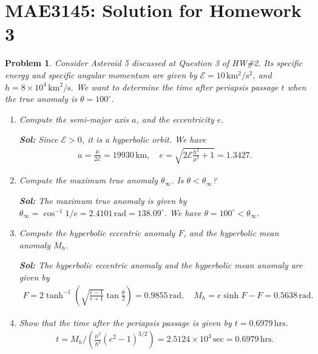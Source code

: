 \documentclass[10pt]{article}
\date{}
\newcommand{\parenth}[1]{\ensuremath{\left( #1 \right)}}
\theoremstyle{plain}\theorembodyfont{\normalfont}
\newtheorem{prob}{Problem}[section]
\newenvironment{subprob}%
{\renewcommand{\theenumi}{\alph{enumi}}\renewcommand{\labelenumi}{(\theenumi)}\begin{enumerate}}%
{\end{enumerate}}%
\begin{document}
\pagestyle{empty}
\section*{MAE3145: Solution for Homework 3}


\begin{prob}
Consider Asteroid 5 discussed at Question 3 of HW\#2. Its specific energy and specific angular momentum are given by $\mathcal{E}=10\,\mathrm{km^2/s^2}$, and $h=8\times 10^4\,\mathrm{km^2/s}$. We want to determine the time after periapsis passage $t$ when the true anomaly is $\theta=100^\circ$.
\begin{subprob}
\item Compute the semi-major axis $a$, and the eccentricity $e$.

\textbf{Sol:} Since $\mathcal{E}>0$, it is a hyperbolic orbit. We have
\begin{align*}
a = \frac{\mu}{2\mathcal{E}} = 19930\,\mathrm{km},\quad 
e = \sqrt{2\mathcal{E} \frac{h^2}{\mu^2} +1} = 1.3427.
\end{align*}

\item Compute the maximum true anomaly $\theta_\infty$. Is $\theta < \theta_\infty$?

\textbf{Sol:} The maximum true anomaly is given by $\theta_\infty=\cos^{-1}{1/e} = 2.4101\,\mathrm{rad} = 138.09^\circ$. We have $\theta = 100^\circ < \theta_\infty$.

\item Compute the hyperbolic eccentric anomaly $F$, and the hyperbolic mean anomaly $M_h$.

\textbf{Sol:} The hyperbolic eccentric anomaly and the hyperbolic mean anomaly are given by
\begin{align*}
F = 2\tanh^{-1}\parenth{\sqrt{\frac{e-1}{e+1}} \tan\frac{\theta}{2}}=0.9855\,\mathrm{rad},\quad M_h = e\sinh F-F= 0.5638\,\mathrm{rad}.
\end{align*}

\item Show that the time after the periapsis passage is given by $t=0.6979\,\mathrm{hrs}$.
\begin{align*}
t = M_h \Big/ \parenth{\frac{\mu^2}{h^3} (e^2-1)^{3/2}}=2.5124\times 10^3\,\mathrm{sec} = 0.6979\,\mathrm{hrs}.
\end{align*}

\end{subprob}
\end{prob}
\end{document}
